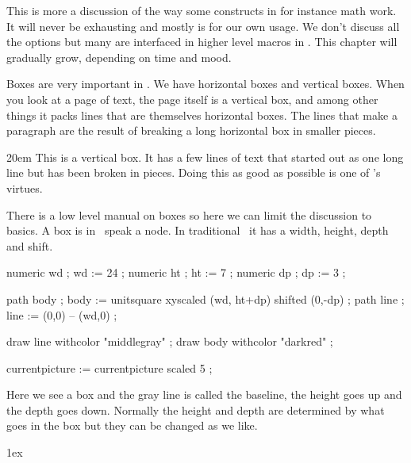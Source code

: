 \startsection[title={Introduction}]

This is more a discussion of the way some constructs in for instance math work.
It will never be exhausting and mostly is for our own usage. We don't discuss all
the options but many are interfaced in higher level macros in \CONTEXT. This
chapter will gradually grow, depending on time and mood.

\stopsection

\startsection[title=Boxes]

Boxes are very important in \TEX. We have horizontal boxes and vertical boxes.
When you look at a page of text, the page itself is a vertical box, and among
other things it packs lines that are themselves horizontal boxes. The lines that
make a paragraph are the result of breaking a long horizontal box in smaller
pieces.

\startlinecorrection
{} \bgroup \hsize 20em \showmakeup[line] \showboxes
    This is a vertical box. It has a few lines of text that started out as
    one long line but has been broken in pieces. Doing this as good as possible
    is one of \TEX's virtues.
\egroup
\stoplinecorrection

There is a low level manual on boxes so here we can limit the discussion to
basics. A box is in \TEX\ speak a node. In traditional \TEX\ it has a
width, height, depth and shift.

\startlinecorrection
\startMPcode
    numeric wd ; wd := 24 ;
    numeric ht ; ht :=  7 ;
    numeric dp ; dp :=  3 ;

    path body ; body := unitsquare xyscaled (wd, ht+dp) shifted (0,-dp) ;
    path line ; line := (0,0) -- (wd,0) ;

    draw line withcolor "middlegray" ;
    draw body withcolor "darkred" ;

    currentpicture := currentpicture scaled 5 ;
\stopMPcode
\stoplinecorrection

Here we see a box and the gray line is called the baseline, the height goes up
and the depth goes down. Normally the height and depth are determined by what
goes in the box but they can be changed as we like.

\startbuffer
\setbox\scratchboxone{}
\setbox\scratchboxtwo{}

\boxshift\scratchboxtwo 1ex \dontleavehmode \box\scratchboxone\box\scratchboxtwo

\setbox\scratchboxone{}
\setbox\scratchboxtwo{}

